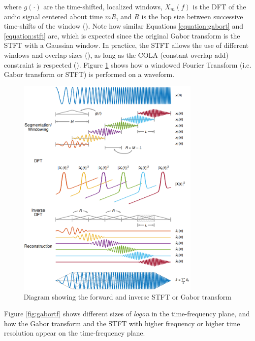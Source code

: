 \documentclass[report.tex]{subfiles}
\begin{document}
where $g(\cdot)$ are the time-shifted, localized windows, $X_{m}(f)$ is the DFT of the audio signal centered about time $mR$, and $R$ is the hop size between successive time-shifts of the window (\cite{dictionary}). Note how similar Equations \eqref{equation:gabort} and \eqref{equation:stft} are, which is expected since the original Gabor transform is the STFT with a Gaussian window. In practice, the STFT allows the use of different windows and overlap sizes (\cite{stftinvertible}), as long as the COLA (constant overlap-add) constraint is respected (\cite{cola}). Figure \ref{fig:stftdiagram} shows how a windowed Fourier Transform (i.e. Gabor transform or STFT) is performed on a waveform.

\begin{figure}[ht]
	\centering
	\includegraphics[width=0.8\textwidth]{./images-tftheory/stft_diagram.png}
	\caption{Diagram showing the forward and inverse STFT or Gabor transform\protect\footnotemark}
	\label{fig:stftdiagram}
\end{figure}


Figure \ref{fig:gabortf} shows different sizes of \textit{logon} in the time-frequency plane, and how the Gabor transform and the STFT with higher frequency or higher time resolution appear on the time-frequency plane.
\end{document}
